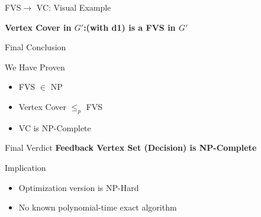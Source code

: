 \documentclass[aspectratio=169]{beamer}
\newcommand{\fvs}{\textsc{FVS}}
\begin{document}
\begin{frame}{\fvs $\rightarrow$ VC: Visual Example}
	\vspace{0.3cm}
	\begin{minipage}{\textwidth}
		\small
		\textbf{Vertex Cover in $G'$:(with d1) is a FVS in  $G'$}
	\end{minipage}
\end{frame}


\begin{frame}{Final Conclusion}

	\begin{block}{We Have Proven}
		\begin{itemize}
			\item FVS $\in$ NP
			\item Vertex Cover $\leq_p$ FVS
			\item VC is NP-Complete
		\end{itemize}
	\end{block}

	\vspace{0.4cm}

	\begin{alertblock}{Final Verdict}
		\textbf{Feedback Vertex Set (Decision) is NP-Complete}
	\end{alertblock}

	\vspace{0.3cm}

	\begin{block}{Implication}
		\begin{itemize}
			\item Optimization version is NP-Hard
			\item No known polynomial-time exact algorithm
		\end{itemize}
	\end{block}

\end{frame}
\end{document}
